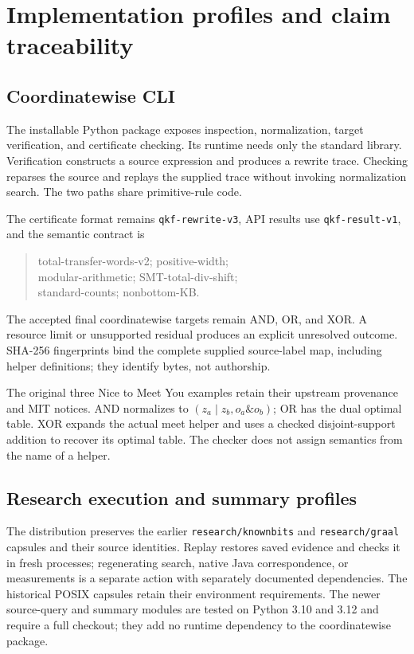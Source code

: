 \section{Implementation profiles and claim traceability}\label{sec:implementation}

\subsection{Coordinatewise CLI}
The installable Python package exposes inspection, normalization, target verification, and certificate checking. Its runtime needs only the standard library. Verification constructs a source expression and produces a rewrite trace. Checking reparses the source and replays the supplied trace without invoking normalization search. The two paths share primitive-rule code.

The certificate format remains \texttt{qkf-rewrite-v3}, API results use \texttt{qkf-result-v1}, and the semantic contract is
\begin{quote}\small\ttfamily\raggedright
total-transfer-words-v2; positive-width;\\
modular-arithmetic; SMT-total-div-shift;\\
standard-counts; nonbottom-KB.
\end{quote}
The accepted final coordinatewise targets remain AND, OR, and XOR. A resource limit or unsupported residual produces an explicit unresolved outcome. SHA-256 fingerprints bind the complete supplied source-label map, including helper definitions; they identify bytes, not authorship.

The original three Nice to Meet You examples retain their upstream provenance and MIT notices. AND normalizes to $(z_a\mathbin{|}z_b,o_a\mathbin{\&}o_b)$; OR has the dual optimal table. XOR expands the actual meet helper and uses a checked disjoint-support addition to recover its optimal table. The checker does not assign semantics from the name of a helper.

\subsection{Research execution and summary profiles}
The distribution preserves the earlier \texttt{research/knownbits} and \texttt{research/graal} capsules and their source identities. Replay restores saved evidence and checks it in fresh processes; regenerating search, native Java correspondence, or measurements is a separate action with separately documented dependencies. The historical POSIX capsules retain their environment requirements. The newer source-query and summary modules are tested on Python 3.10 and 3.12 and require a full checkout; they add no runtime dependency to the coordinatewise package.

